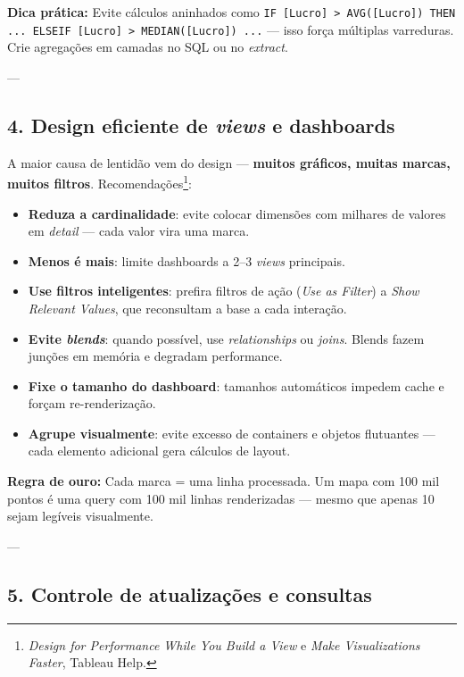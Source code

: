 \begin{FormulaBox}
\textbf{Dica prática:}  
Evite cálculos aninhados como  
\texttt{IF [Lucro] > AVG([Lucro]) THEN ... ELSEIF [Lucro] > MEDIAN([Lucro]) ...}  
— isso força múltiplas varreduras.  
Crie agregações em camadas no SQL ou no \textit{extract}.
\end{FormulaBox}

---

\subsection{4. Design eficiente de \textit{views} e dashboards}

A maior causa de lentidão vem do design — \textbf{muitos gráficos, muitas marcas, muitos filtros}.  
Recomendações\footnote{\textit{Design for Performance While You Build a View} e \textit{Make Visualizations Faster}, Tableau Help.}:
\begin{itemize}[leftmargin=*]
  \item \textbf{Reduza a cardinalidade}: evite colocar dimensões com milhares de valores em \textit{detail} — cada valor vira uma marca.  
  \item \textbf{Menos é mais}: limite dashboards a 2–3 \textit{views} principais.  
  \item \textbf{Use filtros inteligentes}: prefira filtros de ação (\textit{Use as Filter}) a \textit{Show Relevant Values}, que reconsultam a base a cada interação.  
  \item \textbf{Evite \textit{blends}}: quando possível, use \textit{relationships} ou \textit{joins}. Blends fazem junções em memória e degradam performance.  
  \item \textbf{Fixe o tamanho do dashboard}: tamanhos automáticos impedem cache e forçam re-renderização.  
  \item \textbf{Agrupe visualmente}: evite excesso de containers e objetos flutuantes — cada elemento adicional gera cálculos de layout.  
\end{itemize}

\begin{NoteBox}
\textbf{Regra de ouro:} Cada marca = uma linha processada.  
Um mapa com 100 mil pontos é uma query com 100 mil linhas renderizadas — mesmo que apenas 10 sejam legíveis visualmente.
\end{NoteBox}

---

\subsection{5. Controle de atualizações e consultas}


